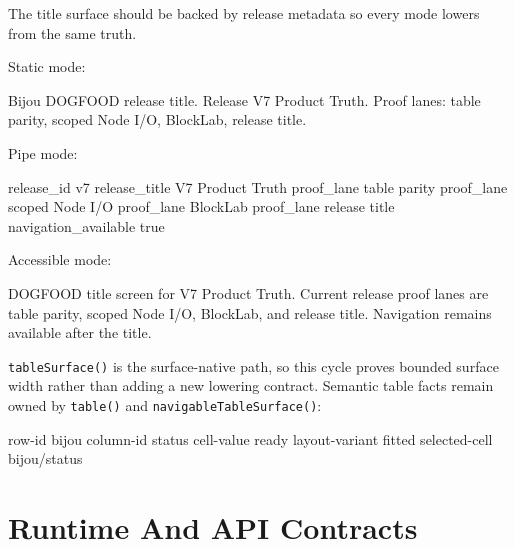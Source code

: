 The title surface should be backed by release metadata so every mode lowers from the same truth.

Static mode:

\begin{CodeBlock}
Bijou DOGFOOD release title. Release V7 Product Truth. Proof lanes: table parity, scoped Node I/O, BlockLab, release title.
\end{CodeBlock}

Pipe mode:

\begin{CodeBlock}
release_id  v7
release_title   V7 Product Truth
proof_lane  table parity
proof_lane  scoped Node I/O
proof_lane  BlockLab
proof_lane  release title
navigation_available    true
\end{CodeBlock}

Accessible mode:

\begin{CodeBlock}
DOGFOOD title screen for V7 Product Truth. Current release proof lanes are table parity, scoped Node I/O, BlockLab, and release title. Navigation remains available after the title.
\end{CodeBlock}

\texttt{t\allowbreak{}a\allowbreak{}b\allowbreak{}l\allowbreak{}e\allowbreak{}S\allowbreak{}u\allowbreak{}r\allowbreak{}f\allowbreak{}a\allowbreak{}c\allowbreak{}e\allowbreak{}(\allowbreak{})} is the surface-native path, so this cycle proves bounded surface width rather than adding a new lowering contract. Semantic table facts remain owned by \texttt{t\allowbreak{}a\allowbreak{}b\allowbreak{}l\allowbreak{}e\allowbreak{}(\allowbreak{})} and \texttt{n\allowbreak{}a\allowbreak{}v\allowbreak{}i\allowbreak{}g\allowbreak{}a\allowbreak{}b\allowbreak{}l\allowbreak{}e\allowbreak{}T\allowbreak{}a\allowbreak{}b\allowbreak{}l\allowbreak{}e\allowbreak{}S\allowbreak{}u\allowbreak{}r\allowbreak{}f\allowbreak{}a\allowbreak{}c\allowbreak{}e\allowbreak{}(\allowbreak{})}:

\begin{CodeBlock}
row-id  bijou
column-id   status
cell-value  ready
layout-variant  fitted
selected-cell   bijou/status
\end{CodeBlock}

\section{Runtime And API Contracts}\label{record-101-runtime-and-api-contracts}

